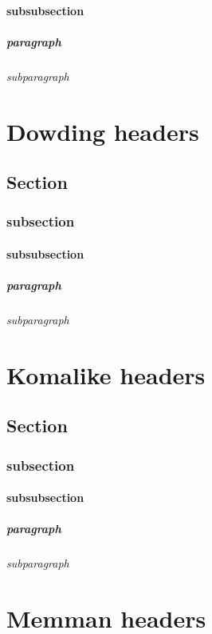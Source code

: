 \documentclass[a4paper, 12pt]{memoir}
\begin{document}
\subsubsection*{subsubsection} 
\paragraph*{paragraph} 
\subparagraph*{subparagraph} 

\chapter*{ Dowding headers } 
\section*{ Section }
\subsection*{subsection }
\subsubsection*{subsubsection} 
\paragraph*{paragraph} 
\subparagraph*{subparagraph} 

\chapter*{ Komalike headers } 
\section*{ Section }
\subsection*{subsection }
\subsubsection*{subsubsection} 
\paragraph*{paragraph} 
\subparagraph*{subparagraph} 


\chapter*{ Memman headers } 
\end{document}
